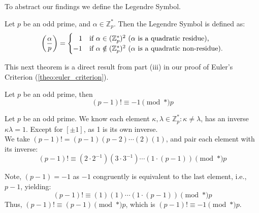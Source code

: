 \newpage
\noindent
To abstract our findings we define the Legendre Symbol.
\begin{Func}

    Let $p$ be an odd prime, and $\alpha\in\mathbb{Z}_p^*$. Then the Legendre Symbol is defined as:
    \[
    \left(\frac{\alpha}{p}\right) = \begin{cases}
        \hspace{.8em}1 & \text{if } \alpha\in(\mathbb{Z}_p^*)^2\text{ ($\alpha$ is a quadratic residue),}\\
        -1 & \text{if } \alpha\notin(\mathbb{Z}_p^*)^2\text{ ($\alpha$ is a quadratic non-residue).}\\
    \end{cases}
    \]
\end{Func}

\noindent
This next theorem is a direct result from part (iii) in our proof of Euler's Criterion (\ref{theo:euler_criterion}).
\begin{theo}

    \label{theo:wilson}
    Let $p$ be an odd prime, then
    \Large
    \[
    (p-1)! \equiv -1 \pmod*{p}
    \]
    \normalsize
\end{theo}

\begin{Proof}

    Let $p$ be an odd prime. We know each element $\kappa,\lambda\in\mathbb{Z}_p^*:\kappa\neq\lambda$, has an inverse
    $\kappa\lambda=1$. Except for $[\pm1]$, as 1 is its own inverse.\\

    \noindent
    We take $(p-1)!=(p-1)(p-2)\cdots(2)(1)$, and pair each element with its inverse:
    \[
        (p-1)! \equiv (2\cdot2^{-1})(3\cdot3^{-1})\cdots(1\cdot(p-1)) \pmod*{p}
    \]

    \noindent
    Note, $(p-1)= -1$ as $-1$ congruently is equivalent to the last element, i.e., $p-1$, yielding:
    \[
        (p-1)! \equiv (1)(1)\cdots (1\cdot(p-1)) \pmod*{p}
    \]
    Thus, $(p-1)! \equiv (p-1) \pmod*{p}$, which is $(p-1)! \equiv -1 \pmod*{p}$.

\end{Proof}